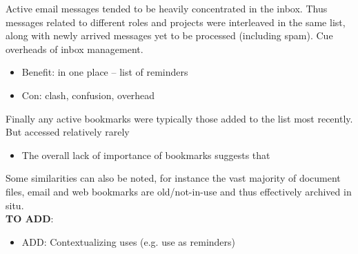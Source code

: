 \noindent
Active email messages tended to be heavily concentrated in the inbox.  Thus messages related to different roles and projects were interleaved in the same list, along with newly arrived messages yet to be processed (including spam). Cue overheads of inbox management.
\begin{itemize}
	\item Benefit: in one place -- list of reminders
	\item Con: clash, confusion, overhead
\end{itemize}

\noindent
Finally any active bookmarks were typically those added to the list most recently. But accessed relatively rarely
\begin{itemize}
	\item The overall lack of importance of bookmarks suggests that 
\end{itemize}

\noindent
Some similarities can also be noted, for instance the vast majority of document files, email and web bookmarks are old/not-in-use and thus effectively archived in situ.
\\

\noindent
\textbf{TO ADD}:
\begin{itemize}
	\item ADD: Contextualizing uses (e.g. use as reminders)
\end{itemize}

